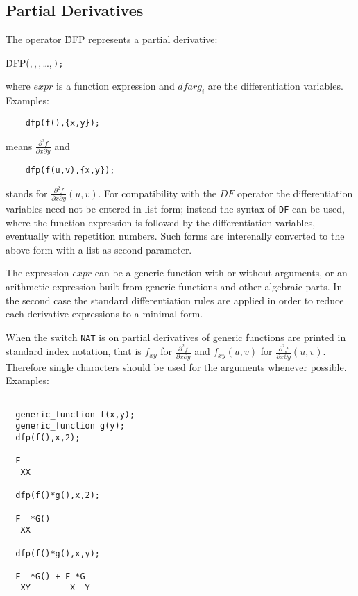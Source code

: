 \subsection{Partial Derivatives}

The operator \f{DFP} represents a partial derivative:
\begin{syntax}
  \f{DFP(},\,,\,,\,\dots,\,\texttt{);}
\end{syntax}
\noindent
where $expr$ is a function expression and $dfarg_i$ are
the differentiation variables. Examples:

\begin{verbatim}
    dfp(f(),{x,y});
\end{verbatim}
means $\frac{\partial ^2 f}{\partial x \partial y}$ and
\begin{verbatim}
    dfp(f(u,v),{x,y});
\end{verbatim}
stands for $\frac{\partial ^2 f}{\partial x \partial y} (u,v)$.
For compatibility with the $DF$ operator the differentiation
variables need not be entered in list form; instead the syntax
of {\tt DF} can be used, where the function expression is followed
by the differentiation variables, eventually with repetition
numbers. Such forms are interenally converted to the above
form with a list as second parameter.

The expression $expr$ can be a generic function
with or without arguments, or an arithmetic expression built
from generic functions and other algebraic parts. In the
second case the standard differentiation rules are applied
in order to reduce each derivative expressions to a minimal
form.

When the switch \texttt{NAT} is on partial derivatives of generic
functions are printed in standard index notation, that is
$f_{xy}$ for $\frac{\partial ^2 f}{\partial x \partial y}$
and $f_{xy}(u,v)$ for $\frac{\partial ^2 f}{\partial x \partial y}(u,v)$.
Therefore single characters should be used for the arguments
whenever possible. Examples:

\begin{verbatim}

  generic_function f(x,y);
  generic_function g(y);
  dfp(f(),x,2);

  F
   XX

  dfp(f()*g(),x,2);

  F  *G()
   XX

  dfp(f()*g(),x,y);

  F  *G() + F *G
   XY        X  Y

\end{verbatim}

